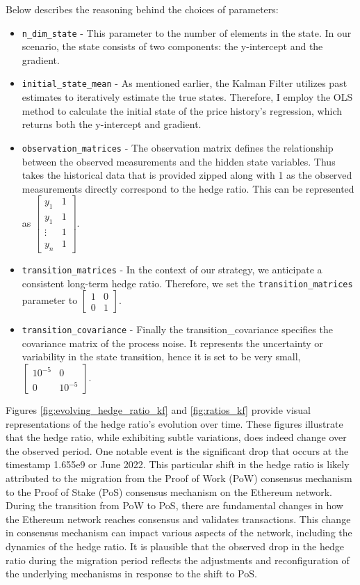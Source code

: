 \noindent Below describes the reasoning behind the choices of parameters:
\begin{itemize}
    \item \texttt{n\_dim\_state} - This parameter to the number of elements in the state. In our scenario, the state consists of two components: the y-intercept and the gradient.
    \item \texttt{initial\_state\_mean} - As mentioned earlier, the Kalman Filter utilizes past estimates to iteratively estimate the true states. Therefore, I employ the OLS method to calculate the initial state of the price history's regression, which returns both the y-intercept and gradient.
    \item \texttt{observation\_matrices} - The observation matrix defines the relationship between the observed measurements and the hidden state variables. Thus takes the historical data that is provided zipped along with 1 as the observed measurements directly correspond to the hedge ratio. This can be represented as $\begin{bmatrix} y_1 & 1 \\ y_1 & 1 \\ \vdots & 1 \\ y_n & 1\end{bmatrix}$.
    \item \texttt{transition\_matrices} - In the context of our strategy, we anticipate a consistent long-term hedge ratio. Therefore, we set the \texttt{transition\_matrices} parameter to $\begin{bmatrix} 1 & 0\\ 0 & 1 \end{bmatrix}$.
    \item \texttt{transition\_covariance} - Finally the transition\_covariance specifies the covariance matrix of the process noise. It represents the uncertainty or variability in the state transition, hence it is set to be very small, $\begin{bmatrix} 10^{-5} & 0\\ 0 & 10^{-5} \end{bmatrix}$.
\end{itemize}

Figures \ref{fig:evolving_hedge_ratio_kf} and \ref{fig:ratios_kf} provide visual representations of the hedge ratio's evolution over time. These figures illustrate that the hedge ratio, while exhibiting subtle variations, does indeed change over the observed period. One notable event is the significant drop that occurs at the timestamp 1.655e9 or June 2022. This particular shift in the hedge ratio is likely attributed to the migration from the Proof of Work (PoW) consensus mechanism to the Proof of Stake (PoS) consensus mechanism on the Ethereum network.
\\[5mm]
During the transition from PoW to PoS, there are fundamental changes in how the Ethereum network reaches consensus and validates transactions. This change in consensus mechanism can impact various aspects of the network, including the dynamics of the hedge ratio. It is plausible that the observed drop in the hedge ratio during the migration period reflects the adjustments and reconfiguration of the underlying mechanisms in response to the shift to PoS.

